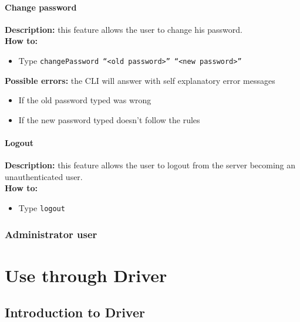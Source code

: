 \documentclass{scalatekids-article}
\begin{document}
\paragraph{Change password}
\label{sec:changepassword}
\textbf{Description:} this feature allows the user to change his password.\\
\textbf{How to:} 
\begin{itemize}
	\item Type \texttt{changePassword ``<old password>'' ``<new password>''}
\end{itemize}
\textbf{Possible errors:} the CLI will answer with self explanatory error messages 
\begin{itemize}
	\item If the old password typed was wrong
	\item If the new password typed doesn't follow the rules %
\end{itemize}

\paragraph{Logout}
\label{sec:removeitem}
\textbf{Description:} this feature allows the user to logout from the server becoming an unauthenticated user.\\
\textbf{How to:} 
\begin{itemize}
	\item Type \texttt{logout}
\end{itemize}

\subsubsection{Administrator user}
\label{sec:administratoruser}



\section{Use through Driver}

\subsection{Introduction to Driver}

\listoftables

\listoffigures
\end{document}
